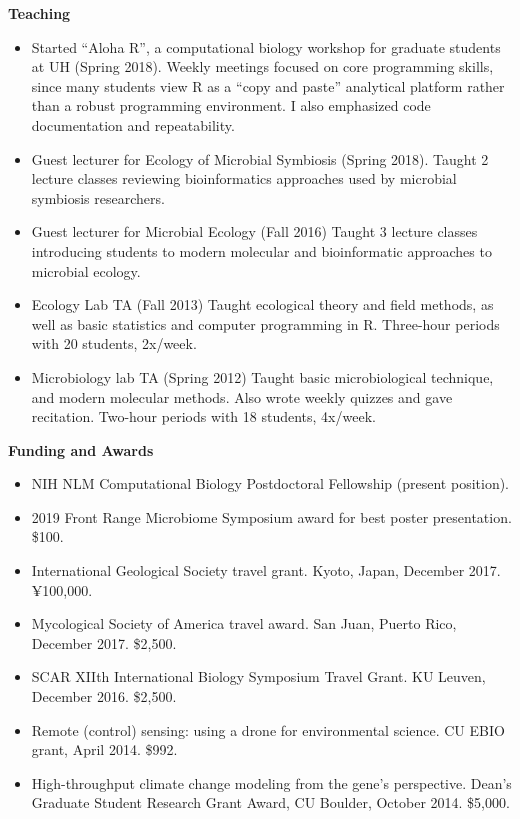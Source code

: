 \documentclass{article}
\begin{document}
\vspace{3mm}
{\large  \textbf{Teaching}}
\begin{itemize}[noitemsep,topsep=0pt, leftmargin=5mm]
  \item Started “Aloha R”, a computational biology workshop for graduate students at UH (Spring 2018). Weekly meetings focused on core programming skills, since many students view R as a “copy and paste” analytical platform rather than a robust programming environment. I also emphasized code documentation and repeatability.
  \item Guest lecturer for Ecology of Microbial Symbiosis (Spring 2018). Taught 2 lecture classes reviewing bioinformatics approaches used by microbial symbiosis researchers.
  \item Guest lecturer for Microbial Ecology (Fall 2016) Taught 3 lecture classes introducing students to modern molecular and bioinformatic approaches to microbial ecology.
  \item Ecology Lab TA (Fall 2013) Taught ecological theory and field methods, as well as basic statistics and computer programming in R. Three-hour periods with 20 students, 2x/week.
  \item Microbiology lab TA (Spring 2012) Taught basic microbiological technique, and modern molecular methods.
Also wrote weekly quizzes and gave recitation. Two-hour periods with 18 students, 4x/week.
\end{itemize}
\vspace{3mm}
{\large  \textbf{Funding and Awards}}
\begin{itemize}[noitemsep,topsep=0pt, leftmargin=5mm]
  \item NIH NLM Computational Biology Postdoctoral Fellowship (present position).
  \item 2019 Front Range Microbiome Symposium award for best poster presentation. \$100.
  \item International Geological Society travel grant. Kyoto, Japan, December 2017. ¥100,000.
  \item Mycological Society of America travel award. San Juan, Puerto Rico, December 2017. \$2,500.
  \item SCAR XIIth International Biology Symposium Travel Grant. KU Leuven, December 2016. \$2,500.
  \item Remote (control) sensing: using a drone for environmental science. CU EBIO grant, April 2014. \$992.
  \item High-throughput climate change modeling from the gene’s perspective. Dean’s Graduate Student Research Grant Award, CU Boulder, October 2014. \$5,000.
\end{itemize}
\end{document}
